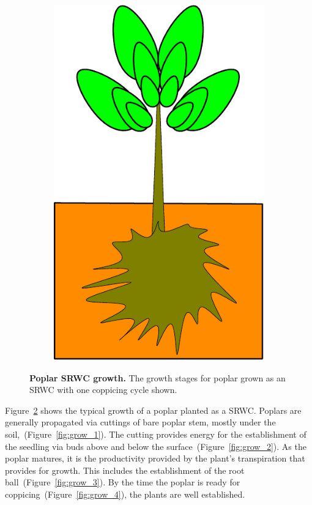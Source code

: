 \documentclass[10pt]{article}
\begin{document}
\begin{figure}[!ht]
\begin{subfigure}[b]{.1125\linewidth}
\includegraphics[width=1.0\linewidth]{img/tree_pics_4}
\caption{}  %
\label{fig:grow_8}
\end{subfigure}
\caption{ \textbf{Poplar \ac{SRWC} growth.} The growth stages for poplar
  grown as an \ac{SRWC} with one coppicing cycle shown. }
\label{fig:grow}
\end{figure}

Figure~\ref{fig:grow} shows the typical growth of a poplar planted as
a \ac{SRWC}.  Poplars are generally propagated via cuttings of bare
poplar stem, mostly under the soil,~(Figure~\ref{fig:grow_1}).  The
cutting provides energy for the establishment of the seedling via buds
above and below the surface~(Figure~\ref{fig:grow_2}). As the poplar
matures, it is the productivity provided by the plant's transpiration
that provides for growth.  This includes the establishment of the root
ball~(Figure~\ref{fig:grow_3}).  By the time the poplar is ready for
coppicing~(Figure~\ref{fig:grow_4}), the plants are well established.
\end{document}
